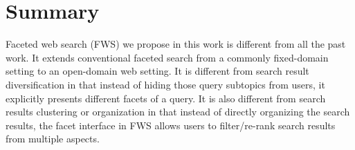 

\section{Summary}
Faceted web search (FWS) we propose in this work is different from all the past work. It extends conventional faceted search from a commonly fixed-domain setting to an open-domain web setting. It is different from search result diversification in that instead of hiding those query subtopics from users, it explicitly presents different facets of a query. It is also different from search results clustering or organization in that instead of directly organizing the search results, the facet interface in FWS allows users to filter/re-rank search results from multiple aspects.

